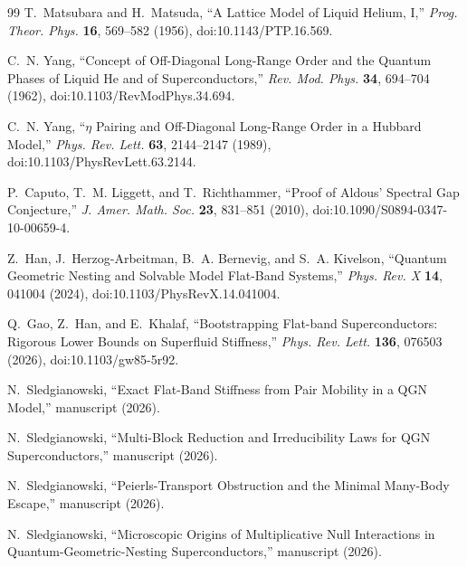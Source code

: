 \documentclass[11pt]{article}
\theoremstyle{definition}
\theoremstyle{remark}
\begin{document}
\begin{thebibliography}{99}
T.~Matsubara and H.~Matsuda,
``A Lattice Model of Liquid Helium, I,''
\emph{Prog. Theor. Phys.} \textbf{16}, 569--582 (1956),
doi:10.1143/PTP.16.569.

C.~N. Yang,
``Concept of Off-Diagonal Long-Range Order and the Quantum Phases of Liquid He and of Superconductors,''
\emph{Rev. Mod. Phys.} \textbf{34}, 694--704 (1962),
doi:10.1103/RevModPhys.34.694.

C.~N. Yang,
``$\eta$ Pairing and Off-Diagonal Long-Range Order in a Hubbard Model,''
\emph{Phys. Rev. Lett.} \textbf{63}, 2144--2147 (1989),
doi:10.1103/PhysRevLett.63.2144.

P.~Caputo, T.~M. Liggett, and T.~Richthammer,
``Proof of Aldous' Spectral Gap Conjecture,''
\emph{J. Amer. Math. Soc.} \textbf{23}, 831--851 (2010),
doi:10.1090/S0894-0347-10-00659-4.

Z.~Han, J.~Herzog-Arbeitman, B.~A. Bernevig, and S.~A. Kivelson,
``Quantum Geometric Nesting and Solvable Model Flat-Band Systems,''
\emph{Phys. Rev. X} \textbf{14}, 041004 (2024),
doi:10.1103/PhysRevX.14.041004.

Q.~Gao, Z.~Han, and E.~Khalaf,
``Bootstrapping Flat-band Superconductors: Rigorous Lower Bounds on Superfluid Stiffness,''
\emph{Phys. Rev. Lett.} \textbf{136}, 076503 (2026),
doi:10.1103/gw85-5r92.

N.~Sledgianowski,
``Exact Flat-Band Stiffness from Pair Mobility in a QGN Model,''
manuscript (2026).

N.~Sledgianowski,
``Multi-Block Reduction and Irreducibility Laws for QGN Superconductors,''
manuscript (2026).

N.~Sledgianowski,
``Peierls-Transport Obstruction and the Minimal Many-Body Escape,''
manuscript (2026).

N.~Sledgianowski,
``Microscopic Origins of Multiplicative Null Interactions in Quantum-Geometric-Nesting Superconductors,''
manuscript (2026).

\end{thebibliography}
\endgroup
\end{document}
